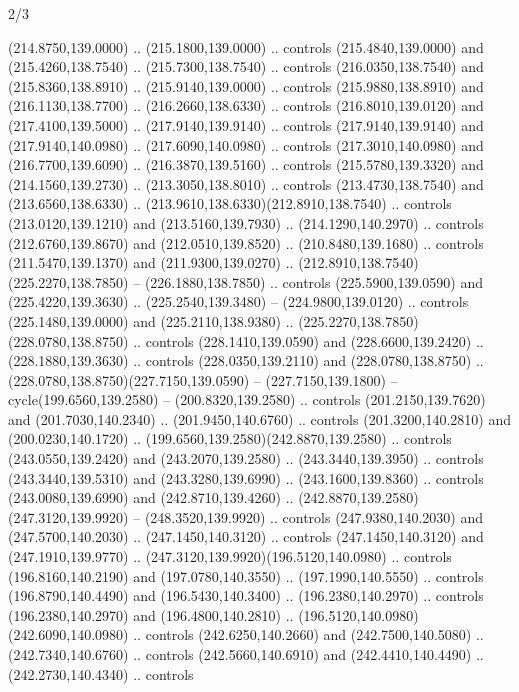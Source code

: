 \begin{flagdescription}{2/3}
\begin{scope}[xshift=0.5\flaglength,yshift=0.5\flagwidth,scale=\flagwidth/259.2]
\begin{scope}[y=0.8pt, x=0.8pt, yscale=-1,shift={(-243,-162)}]
      (214.8750,139.0000) .. (215.1800,139.0000) .. controls (215.4840,139.0000) and
      (215.4260,138.7540) .. (215.7300,138.7540) .. controls (216.0350,138.7540) and
      (215.8360,138.8910) .. (215.9140,139.0000) .. controls (215.9880,138.8910) and
      (216.1130,138.7700) .. (216.2660,138.6330) .. controls (216.8010,139.0120) and
      (217.4100,139.5000) .. (217.9140,139.9140) .. controls (217.9140,139.9140) and
      (217.9140,140.0980) .. (217.6090,140.0980) .. controls (217.3010,140.0980) and
      (216.7700,139.6090) .. (216.3870,139.5160) .. controls (215.5780,139.3320) and
      (214.1560,139.2730) .. (213.3050,138.8010) .. controls (213.4730,138.7540) and
      (213.6560,138.6330) .. (213.9610,138.6330)(212.8910,138.7540) .. controls
      (213.0120,139.1210) and (213.5160,139.7930) .. (214.1290,140.2970) .. controls
      (212.6760,139.8670) and (212.0510,139.8520) .. (210.8480,139.1680) .. controls
      (211.5470,139.1370) and (211.9300,139.0270) ..
      (212.8910,138.7540)(225.2270,138.7850) -- (226.1880,138.7850) .. controls
      (225.5900,139.0590) and (225.4220,139.3630) .. (225.2540,139.3480) --
      (224.9800,139.0120) .. controls (225.1480,139.0000) and (225.2110,138.9380) ..
      (225.2270,138.7850)(228.0780,138.8750) .. controls (228.1410,139.0590) and
      (228.6600,139.2420) .. (228.1880,139.3630) .. controls (228.0350,139.2110) and
      (228.0780,138.8750) .. (228.0780,138.8750)(227.7150,139.0590) --
      (227.7150,139.1800) -- cycle(199.6560,139.2580) -- (200.8320,139.2580) ..
      controls (201.2150,139.7620) and (201.7030,140.2340) .. (201.9450,140.6760) ..
      controls (201.3200,140.2810) and (200.0230,140.1720) ..
      (199.6560,139.2580)(242.8870,139.2580) .. controls (243.0550,139.2420) and
      (243.2070,139.2580) .. (243.3440,139.3950) .. controls (243.3440,139.5310) and
      (243.3280,139.6990) .. (243.1600,139.8360) .. controls (243.0080,139.6990) and
      (242.8710,139.4260) .. (242.8870,139.2580)(247.3120,139.9920) --
      (248.3520,139.9920) .. controls (247.9380,140.2030) and (247.5700,140.2030) ..
      (247.1450,140.3120) .. controls (247.1450,140.3120) and (247.1910,139.9770) ..
      (247.3120,139.9920)(196.5120,140.0980) .. controls (196.8160,140.2190) and
      (197.0780,140.3550) .. (197.1990,140.5550) .. controls (196.8790,140.4490) and
      (196.5430,140.3400) .. (196.2380,140.2970) .. controls (196.2380,140.2970) and
      (196.4800,140.2810) .. (196.5120,140.0980)(242.6090,140.0980) .. controls
      (242.6250,140.2660) and (242.7500,140.5080) .. (242.7340,140.6760) .. controls
      (242.5660,140.6910) and (242.4410,140.4490) .. (242.2730,140.4340) .. controls

\end{scope}
\end{scope}
\end{flagdescription}
